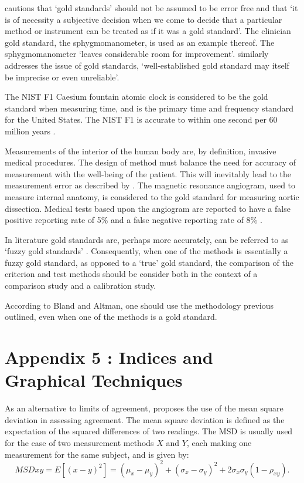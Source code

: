 \documentclass[12pt, a4paper]{report}
\theoremstyle{plain}
\theoremstyle{definition}
\theoremstyle{remark}
\begin{document}


\citet[p.47]{DunnSEME} cautions that `gold standards' should not be
assumed to be error free and that `it is of necessity a subjective
decision when we come to decide that a particular method or
instrument can be treated as if it was a gold standard'. The
clinician gold standard, the sphygmomanometer, is used as an
example thereof.  The sphygmomanometer `leaves considerable room
for improvement'. \citet{pizzi} similarly addresses the issue of gold standards, `well-established gold
standard may itself be imprecise or even unreliable'.


The NIST F1 Caesium fountain atomic clock is considered to be the gold standard when measuring time, and is the primary time and
frequency standard for the United States. The NIST F1 is accurate to within one second per 60 million years \citep{NIST}.

Measurements of the interior of the human body are, by definition,
invasive medical procedures. The design of method must balance the need for accuracy of measurement with the well-being of the	patient. This will inevitably lead to the measurement error as described by \citet{DunnSEME}. The magnetic resonance angiogram,
used to measure internal anatomy, is considered to the gold	standard for measuring aortic dissection. Medical tests based upon
the angiogram are reported to have a false positive reporting rate
of 5\% and a false negative reporting rate of 8\% \citep{ACR}.

In literature gold standards are, perhaps more accurately, can be referred to as
`fuzzy gold standards' \citep{phelps}. Consequently, when one of the methods is
essentially a fuzzy gold standard, as opposed to a `true' gold standard, the comparison of the criterion and test methods should
be consider both in the context of a comparison study and a	calibration study.




According to Bland and Altman, one should use the methodology
previous outlined, even when one of the methods is a gold standard.



\section{Appendix 5 : Indices and Graphical Techniques}


As an alternative to limits of agreement, \citet{lin2002} proposes the use of
the mean square deviation in assessing agreement. The mean square
deviation is defined as the expectation of the squared differences
of two readings. The MSD is usually used for the case of two
measurement methods $X$ and $Y$, each making one measurement for
the same subject, and is given by:
\[
MSDxy = E[(x - y)^2]  = (\mu_{x} - \mu_{y})^2 + (\sigma_{x} -
\sigma_{y})^2 + 2\sigma_{x}\sigma_{y}(1-\rho_{xy}).
\]
\end{document}
